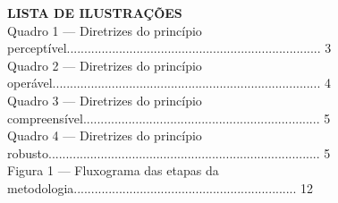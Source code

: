 \documentclass[a4paper]{article}
\begin{document}
\begin{titlepage}
	\begin{center}
		{\large \textbf{LISTA DE ILUSTRAÇÕES}}\\[1cm]
		Quadro 1 — Diretrizes do princípio perceptível......................................................................... 3\\[0.5cm]
		Quadro 2 — Diretrizes do princípio operável............................................................................. 4\\[0.5cm]
		Quadro 3 — Diretrizes do princípio compreensível.................................................................... 5\\[0.5cm]
		Quadro 4 — Diretrizes do princípio robusto.............................................................................. 5\\[0.5cm]
		Figura 1 — Fluxograma das etapas da metodologia................................................................ 12\\[0.5cm]
	\end{center}
\end{titlepage}
\end{document}
